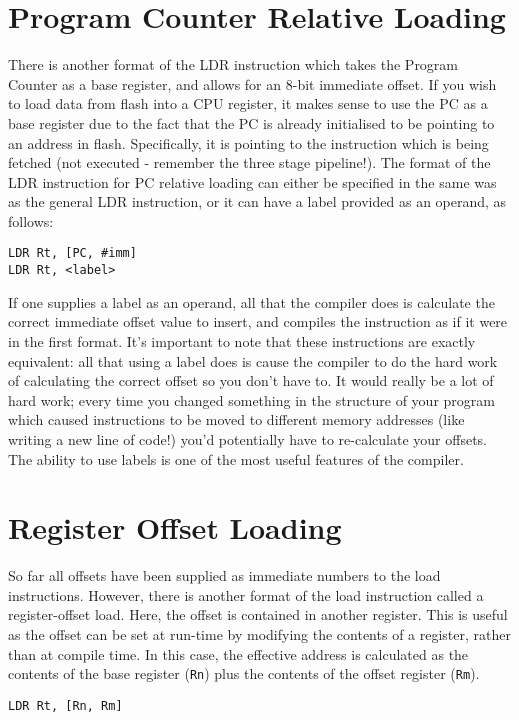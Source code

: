 \section{Program Counter Relative Loading}
There is another format of the LDR instruction which takes the Program Counter as a base register, and allows for an 8-bit immediate offset. If you wish to load data from flash into a CPU register, it makes sense to use the PC as a base register due to the fact that the PC is already initialised to be pointing to an address in flash. Specifically, it is pointing to the instruction which is being fetched (not executed - remember the three stage pipeline!). The format of the LDR instruction for PC relative loading can either be specified in the same was as the general LDR instruction, or it can have a label provided as an operand, as follows:
\begin{lstlisting}[fontadjust=true,frame=trBL]
LDR Rt, [PC, #imm]
LDR Rt, <label>
\end{lstlisting}
If one supplies a label as an operand, all that the compiler does is calculate the correct immediate offset value to insert, and compiles the instruction as if it were in the first format. It's important to note that these instructions are exactly equivalent: all that using a label does is cause the compiler to do the hard work of calculating the correct offset so you don't have to. It would really be a lot of hard work; every time you changed something in the structure of your program which caused instructions to be moved to different memory addresses (like writing a new line of code!) you'd potentially have to re-calculate your offsets. The ability to use labels is one of the most useful features of the compiler.


\section{Register Offset Loading}
So far all offsets have been supplied as immediate numbers to the load instructions. However, there is another format of the load instruction called a register-offset load. Here, the offset is contained in another register. This is useful as the offset can be set at run-time by modifying the contents of a register, rather than at compile time. In this case, the effective address is calculated as the contents of the base register (\texttt{Rn}) plus the contents of the offset register (\texttt{Rm}). 
\begin{lstlisting}[fontadjust=true,frame=trBL]
LDR Rt, [Rn, Rm]
\end{lstlisting}

